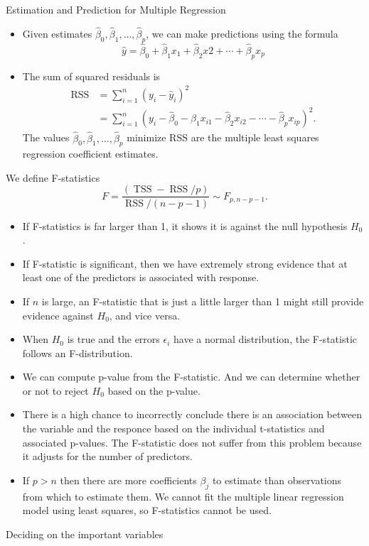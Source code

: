 \documentclass[11pt, a4paper]{article}
\begin{document}
Estimation and Prediction for Multiple Regression
\begin{itemize}
  \item Given estimates $\hat{\beta}_0, \hat{\beta}_1,\dots,\hat{\beta}_p$, we can make predictions using the formula 
\[
  \hat{y}=\hat{\beta}_0+\hat{\beta}_1x_1 + \hat{\beta}_2x2+\cdots+\hat{\beta}_px_p
\]
\item The sum of squared residuals is
  \begin{align}
    \operatorname{RSS}&=\sum_{i=1}^n(y_i-\hat{y}_i)^2\\
    &=\sum_{i=1}^n(y_i-\hat{\beta}_0-\hat{\beta}_1x_{i1}-\hat{\beta}_2x_{i2}-\cdots-\hat{\beta}_px_{ip})^2.
  \end{align}
  The values $\hat{\beta}_0,\hat{\beta}_1,\dots,\hat{\beta}_p$ minimize RSS are the multiple least squares regression coefficient estimates.
\end{itemize}
We define F-statistics
\[
  F=\frac{(\operatorname{TSS}-\operatorname{RSS}/p)}{\operatorname{RSS}/(n-p-1)}\sim F_{p,n-p-1}.
\]
\begin{itemize}
  \item If F-statistics is far larger than 1, it shows it is against the null hypothesis $H_0$.
  \item If F-statistic is significant, then we have extremely strong
    evidence that at least one of the predictors is associated with response.
\item If $n$ is large, an F-statistic that is just a little larger than 1 might still provide evidence against $H_0$, and vice versa.
\item When $H_0$ is true and the errors $\epsilon_i$ have a normal distribution, the F-statistic follows an F-distribution.
\item We can compute p-value from the F-statistic. And we can determine whether or not to reject $H_0$ based on the p-value.
\item There is a high chance to incorrectly conclude there is an association between the variable and the responce based on the individual t-statistics and associated p-values. The F-statistic does not suffer from this problem because it adjusts for the number of
  predictors.
\item If $p>n$ then there are more coefficients $\beta_j$ to estimate than observations from which to estimate them. We cannot fit the multiple linear regression model using least squares, so F-statistics cannot be used.
\end{itemize}
Deciding on the important variables
\end{document}
